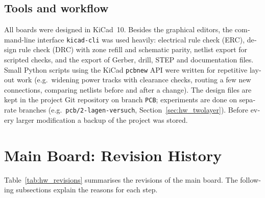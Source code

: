 \begin{otherlanguage}{english}
\subsection{Tools and workflow}
All boards were designed in KiCad~10. Besides the graphical editors, the command-line interface
\texttt{kicad-cli} was used heavily: electrical rule check (ERC), design rule check (DRC) with
zone refill and schematic parity, netlist export for scripted checks, and the export of Gerber,
drill, STEP and documentation files. Small Python scripts using the KiCad \texttt{pcbnew} API
were written for repetitive layout work (e.g.\ widening power tracks with clearance checks,
routing a few new connections, comparing netlists before and after a change).
The design files are kept in the project Git repository on branch \texttt{PCB}; experiments are
done on separate branches (e.g.\ \texttt{pcb/2-lagen-versuch}, Section~\ref{sec:hw_twolayer}).
Before every larger modification a backup of the project was stored.

\section{Main Board: Revision History}
\label{sec:hw_revisions}

Table~\ref{tab:hw_revisions} summarises the revisions of the main board. The following
subsections explain the reasons for each step.


\end{otherlanguage}
